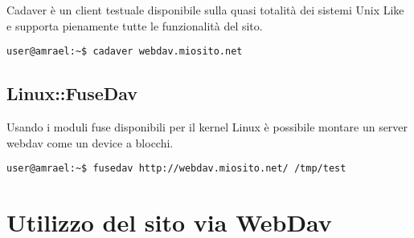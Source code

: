 Cadaver è un client  testuale disponibile sulla quasi totalità dei sistemi Unix Like e supporta pienamente tutte le funzionalità del sito.

\begin{verbatim}
user@amrael:~$ cadaver webdav.miosito.net
\end{verbatim}


\subsection{Linux::FuseDav}

Usando i moduli fuse disponibili per il kernel Linux è possibile montare un server webdav come un device a blocchi. 
\begin{verbatim}
user@amrael:~$ fusedav http://webdav.miosito.net/ /tmp/test
\end{verbatim}
\section{Utilizzo del sito via WebDav}
